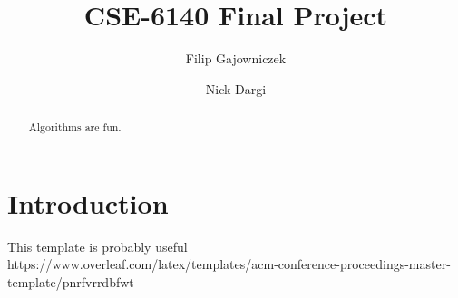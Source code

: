 \documentclass[format=sigconf]{acmart}
\begin{document}
\title{CSE-6140 Final Project}
\author{Filip Gajowniczek}
\author{Nick Dargi}

\begin{abstract}
Algorithms are fun.
\end{abstract}
\section{Introduction}
This template is probably useful\\ https://www.overleaf.com/latex/templates/acm-conference-proceedings-master-template/pnrfvrrdbfwt
\end{document}
